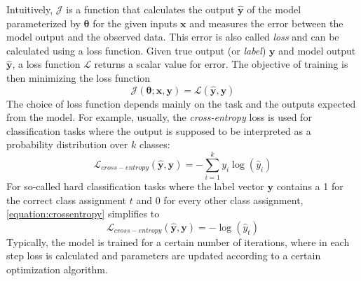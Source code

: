 Intuitively, $\mathcal{J}$ is a function that 
calculates the output $\mathbf{\hat{y}}$ of the model 
parameterized by $\bm{\theta}$
for the given inputs $\mathbf{x}$ and
measures the error between 
the model output and the observed data.
This error is also called \textit{loss} and can be calculated 
using a loss function. 
Given true output (or \textit{label}) \(\mathbf{y}\) 
and model output \(\mathbf{\hat{y}}\), a loss function $\mathcal{L}$
returns a scalar value for error. 
The objective of training is then minimizing the loss function
\begin{equation}
    \mathcal{J}(\bm{\theta}; \mathbf{x}, \mathbf{y}) = \mathcal{L}(\mathbf{\hat{y}}, \mathbf{y})
\end{equation}
The choice of loss function 
depends mainly on the task and the outputs expected from the 
model. For example, usually, the \textit{cross-entropy} loss is used 
for classification tasks where the output 
is supposed to be interpreted as a probability distribution 
over \(k\) classes:
\begin{equation}\label{equation:crossentropy}
    \mathcal{L}_{cross-entropy}(\mathbf{\hat{y}}, \mathbf{y}) = -\sum_{i=1}^{k} y_i\log{(\hat{y}_i)}
\end{equation}
For so-called hard classification tasks where 
the label vector \(\mathbf{y}\) contains a 1 for the correct class assignment $t$
and 0 for every other class assignment, \autoref{equation:crossentropy} 
simplifies to
\begin{equation}
    \mathcal{L}_{cross-entropy}(\mathbf{\hat{y}}, \mathbf{y}) = -\log{(\hat{y}_t)}
\end{equation}
Typically, the model is trained for a certain number of iterations, 
where in each step loss is calculated and parameters are 
updated according to a certain optimization algorithm.

